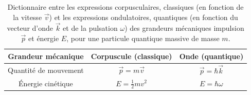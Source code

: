 \documentclass[12pt,fancy]{cours}
\begin{document}

\begin{table}[h!]
  \centering
\renewcommand{\arraystretch}{1.5}
  \begin{tabular}{|c|c|c|}
    \hline
Grandeur mécanique &   Corpuscule (classique) & Onde (quantique) \\
    \hline
  Quantité de mouvement  & $\Vec{p}=m \Vec{v}$ & $\Vec{p} = \hbar \Vec{k}$\\
    \hline
  Énergie cinétique &  $E=\frac{1}{2} m v^2$ & $E=\hbar \omega$
  \\%
    \hline
  \end{tabular}
  \caption{Dictionnaire entre les expressions corpusculaires, classiques (en fonction de la vitesse $\Vec{v}$) et les expressions ondulatoires, quantiques (en fonction du vecteur d'onde $\Vec{k}$ et de la pulsation $\omega$) des grandeurs mécaniques impulsion $\Vec{p}$ et énergie $E$, pour une particule quantique massive de masse $m$.}
  \label{tab:dico_Ep}

\end{table}
\end{document}

